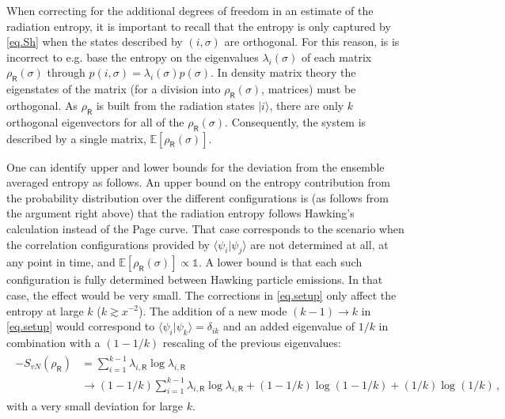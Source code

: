 \documentclass[12pt]{article}
\numberwithin{equation}{section}
\begin{document}
When correcting for the additional degrees of freedom in an estimate of the radiation entropy, it is important to recall that the entropy is only captured by \eqref{eq.Sh} when the states described by $(i,\sigma)$ are orthogonal. For this reason, is is incorrect to e.g. base the entropy on the eigenvalues $\lambda_i(\sigma)$ of each matrix $\rho_\textsf{R}(\sigma)$ through $p(i,\sigma)=\lambda_i(\sigma)p(\sigma)$. In density matrix theory the eigenstates of the matrix (for a division into $\rho_\textsf{R}(\sigma)$, matrices) must be orthogonal. As $\rho_\textsf{R}$ is built from the radiation states $|i\rangle$, there are only $k$ orthogonal eigenvectors for all of the $\rho_\textsf{R}(\sigma)$. Consequently, the system is described by a single matrix, $\mathbb{E}[\rho_\textsf{R}(\sigma)]$.

One can identify upper and lower bounds for the deviation from the ensemble averaged entropy as follows. An upper bound on the entropy contribution from the probability distribution over the different configurations is (as follows from the argument right above) that the radiation entropy follows Hawking's calculation instead of the Page curve. That case corresponds to the scenario when the correlation configurations provided by $\langle\psi_i|\psi_j\rangle$ are not determined at all, at any point in time, and $\mathbb{E}[\rho_\textsf{R}(\sigma)]\propto\mathbb{1}$. A lower bound is that each such configuration is fully determined between Hawking particle emissions. In that case, the effect would be very small. The corrections in \eqref{eq.setup} only affect the entropy at large $k$ ($k\gtrsim x^{-2}$). The addition of a new mode $(k-1)\rightarrow k$ in \eqref{eq.setup} would correspond to $\langle\psi_i|\psi_k\rangle=\delta_{ik}$ and an added eigenvalue of $1/k$ in combination with a $(1-1/k)$ rescaling of the previous eigenvalues:
\begin{gather}\begin{aligned}
-S_{vN}(\rho_\textsf{R})&=\sum_{i=1}^{k-1}\lambda_{i,\textsf{R}}\log\lambda_{i,\textsf{R}}\\
&\rightarrow \left(1-1/k\right)\sum_{i=1}^{k-1}\lambda_{i,\textsf{R}}\log\lambda_{i,\textsf{R}}+(1-1/k)\log(1-1/k)+(1/k)\log(1/k)\,,
\end{aligned}\end{gather}
with a very small deviation for large $k$.
\end{document}
